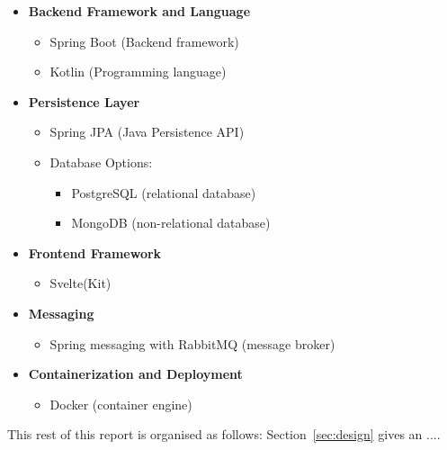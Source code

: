 \begin{itemize}
    \item \textbf{Backend Framework and Language}
    \begin{itemize}
        \item Spring Boot (Backend framework)
        \item Kotlin (Programming language)
    \end{itemize}
    
    \item \textbf{Persistence Layer}
    \begin{itemize}
        \item Spring JPA (Java Persistence API)
        \item Database Options:
        \begin{itemize}
            \item PostgreSQL (relational database)
            \item MongoDB (non-relational database)
        \end{itemize}
    \end{itemize}

    \item \textbf{Frontend Framework}
    \begin{itemize}
        \item Svelte(Kit)
    \end{itemize}

    \item \textbf{Messaging}
    \begin{itemize}
        \item Spring messaging with RabbitMQ (message broker)
    \end{itemize}

    \item \textbf{Containerization and Deployment}
    \begin{itemize}
        \item Docker (container engine)
    \end{itemize}
\end{itemize}


\noindent
This rest of this report is organised as follows:
Section~\ref{sec:design} gives an ....
